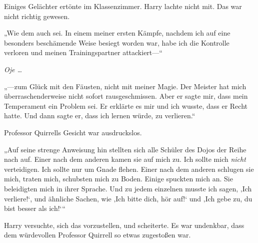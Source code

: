 Einiges Gelächter ertönte im Klassenzimmer. Harry lachte nicht mit. Das war nicht richtig gewesen.

„Wie dem auch sei. In einem meiner ersten Kämpfe, nachdem ich auf eine besonders beschämende Weise besiegt worden war, habe ich die Kontrolle verloren und meinen Trainingspartner attackiert—“

\emph{Oje …}

„—zum Glück mit den Fäusten, nicht mit meiner Magie. Der Meister hat mich überraschenderweise nicht sofort rausgeschmissen. Aber er sagte mir, dass mein Temperament ein Problem sei. Er erklärte es mir und ich wusste, dass er Recht hatte. Und dann sagte er, dass ich lernen würde, zu verlieren.“

Professor Quirrells Gesicht war ausdruckslos.

„Auf seine strenge Anweisung hin stellten sich alle Schüler des Dojos der Reihe nach auf. Einer nach dem anderen kamen sie auf mich zu. Ich sollte mich \emph{nicht} verteidigen. Ich sollte nur um Gnade flehen. Einer nach dem anderen schlugen sie mich, traten mich, schubsten mich zu Boden. Einige spuckten mich an. Sie beleidigten mich in ihrer Sprache. Und zu jedem einzelnen musste ich sagen, ‚Ich verliere!‘, und ähnliche Sachen, wie ‚Ich bitte dich, hör auf!‘ und ‚Ich gebe zu, du bist besser als ich!‘“

Harry versuchte, sich das vorzustellen, und scheiterte. Es war undenkbar, dass dem würdevollen Professor Quirrell so etwas zugestoßen war.


